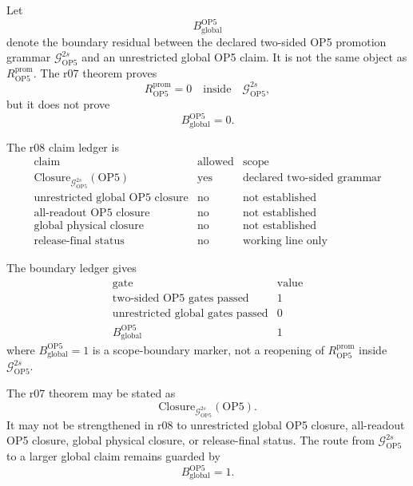 \begin{definition}
Let
\[
    B_{\mathrm{global}}^{\mathrm{OP5}}
\]
denote the boundary residual between the declared two-sided OP5 promotion
grammar \(\mathcal G_{\mathrm{OP5}}^{2s}\) and an unrestricted global OP5
claim.  It is not the same object as \(R_{\mathrm{OP5}}^{\mathrm{prom}}\).
The r07 theorem proves
\[
    R_{\mathrm{OP5}}^{\mathrm{prom}}=0
    \quad\text{inside}\quad
    \mathcal G_{\mathrm{OP5}}^{2s},
\]
but it does not prove
\[
    B_{\mathrm{global}}^{\mathrm{OP5}}=0.
\]
\end{definition}

\begin{proposition}
The r08 claim ledger is
\[
\begin{array}{c|c|c}
\text{claim} & \text{allowed} & \text{scope}\\
\hline
\mathrm{Closure}_{\mathcal G_{\mathrm{OP5}}^{2s}}(\mathrm{OP5})
& \mathrm{yes} & \text{declared two-sided grammar}\\
\text{unrestricted global OP5 closure}
& \mathrm{no} & \text{not established}\\
\text{all-readout OP5 closure}
& \mathrm{no} & \text{not established}\\
\text{global physical closure}
& \mathrm{no} & \text{not established}\\
\text{release-final status}
& \mathrm{no} & \text{working line only}
\end{array}
\]
\end{proposition}

\begin{proposition}
The boundary ledger gives
\[
\begin{array}{c|r}
\text{gate} & \text{value}\\
\hline
\text{two-sided OP5 gates passed} & 1\\
\text{unrestricted global gates passed} & 0\\
B_{\mathrm{global}}^{\mathrm{OP5}} & 1
\end{array}
\]
where \(B_{\mathrm{global}}^{\mathrm{OP5}}=1\) is a scope-boundary marker, not
a reopening of \(R_{\mathrm{OP5}}^{\mathrm{prom}}\) inside
\(\mathcal G_{\mathrm{OP5}}^{2s}\).
\end{proposition}

\begin{theorem}
The r07 theorem may be stated as
\[
    \mathrm{Closure}_{\mathcal G_{\mathrm{OP5}}^{2s}}(\mathrm{OP5}).
\]
It may not be strengthened in r08 to unrestricted global OP5 closure, all-readout
OP5 closure, global physical closure, or release-final status.  The route from
\(\mathcal G_{\mathrm{OP5}}^{2s}\) to a larger global claim remains guarded by
\[
    B_{\mathrm{global}}^{\mathrm{OP5}}=1.
\]
\end{theorem}


